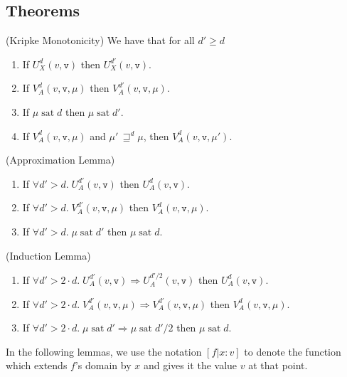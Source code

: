 \documentclass[preprint]{sigplanconf}
\newcommand{\betterstate}[3]{{#2}\, {\sqsupseteq}^{#1} {#3}}
\renewcommand{\implies}{\Rightarrow}
\newcommand{\term}[1]{\ensuremath{\mathtt{{#1}}}}
\newcommand{\satisfy}[2]{{#1}\;\mathrm{sat}\;{#2}}
\begin{document}
\subsection{Theorems}

\begin{prop}{(Kripke Monotonicity)}
We have that for all $d' \geq d$
\begin{enumerate}
\item If $U^d_X(v, \term{v})$ then $U^{d'}_X(v, \term{v})$. 
\item If $V^d_A(v, \term{v}, \mu)$ then $V^{d'}_A(v, \term{v}, \mu)$. 
\item If $\satisfy{\mu}{d}$ then $\satisfy{\mu}{d'}$. 
\item If $V^d_A(v, \term{v}, \mu)$ and $\betterstate{d}{\mu'}{\mu}$, then $V^d_A(v, \term{v}, \mu')$.
\end{enumerate}
\end{prop}

\begin{lemma}{(Approximation Lemma)}
\begin{enumerate}
  \item If $\forall d' > d.\; U^{d'}_A(v, \term{v})$ then $U^d_A(v, \term{v})$. 
  \item If $\forall d' > d.\; V^{d'}_A(v, \term{v}, \mu)$ then $V^d_A(v, \term{v}, \mu)$. 
  \item If $\forall d' > d.\; \satisfy{\mu}{d'}$ then $\satisfy{\mu}{d}$. 
\end{enumerate}
\end{lemma}

\begin{lemma}{(Induction Lemma)}
\begin{enumerate}
  \item If $\forall d' > 2\cdot d.\; U^{d'}_A(v, \term{v}) \implies U^{d'/2}_A(v, \term{v})$ then $U^d_A(v, \term{v})$. 
  \item If $\forall d' > 2\cdot d.\; V^{d'}_A(v, \term{v}, \mu) \implies V^{d'}_A(v, \term{v}, \mu)$ then $V^d_A(v, \term{v}, \mu)$. 
  \item If $\forall d' > 2\cdot d.\; \satisfy{\mu}{d'} \implies \satisfy{\mu}{d'/2}$ then $\satisfy{\mu}{d}$. 
\end{enumerate}
\end{lemma}

In the following lemmas, we use the notation $[f|x:v]$ to denote the function which extends $f$'s domain 
by $x$ and gives it the value $v$ at that point. 
\end{document}

